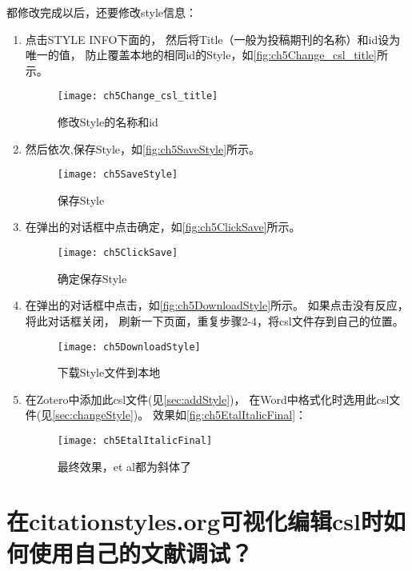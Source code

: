 \documentclass[theorem=false,mathfont=none,openany,sub3section]{easybook}
\begin{document}
{都修改完成以后，还要修改style信息：
\begin{enumerate} \label{it:StyleInfo}
	\item 点击STYLE INFO下面的，
	然后将Title（一般为投稿期刊的名称）和id设为唯一的值，
	防止覆盖本地的相同id的Style，如\autoref{fig:ch5Change_csl_title}所示。
	\begin{figure}[htbp]
		\centering
		\texttt{[image: ch5Change\_csl\_title]}
		\caption{修改Style的名称和id}
		\label{fig:ch5Change_csl_title}
	\end{figure}
	\item 然后依次,保存Style，如\autoref{fig:ch5SaveStyle}所示。
	\begin{figure}[htbp]
		\centering
		\texttt{[image: ch5SaveStyle]}
		\caption{保存Style}
		\label{fig:ch5SaveStyle}
	\end{figure}
	\item 在弹出的对话框中点击确定，如\autoref{fig:ch5ClickSave}所示。
	\begin{figure}[htbp]
		\centering
		\texttt{[image: ch5ClickSave]}
		\caption{确定保存Style}
		\label{fig:ch5ClickSave}
	\end{figure}
	\item 在弹出的对话框中点击，如\autoref{fig:ch5DownloadStyle}所示。
	如果点击没有反应，将此对话框关闭，
	刷新一下页面，重复步骤2-4，将csl文件存到自己的位置。
	\begin{figure}[htbp]
		\centering
		\texttt{[image: ch5DownloadStyle]}
		\caption{下载Style文件到本地}
		\label{fig:ch5DownloadStyle}
	\end{figure}
	\item 在Zotero中添加此csl文件(见\cref{sec:addStyle})，
	在Word中格式化时选用此csl文件(见\cref{sec:changeStyle})。
	效果如\autoref{fig:ch5EtalItalicFinal}：
	\begin{figure}[htbp]
		\centering
		\texttt{[image: ch5EtalItalicFinal]}
		\caption{最终效果，et al都为斜体了}
		\label{fig:ch5EtalItalicFinal}
	\end{figure}
\end{enumerate}	

\section{在citationstyles.org可视化编辑csl时如何使用自己的文献调试？}\label{sec:csl_custom_citation}	

}
\end{document}
